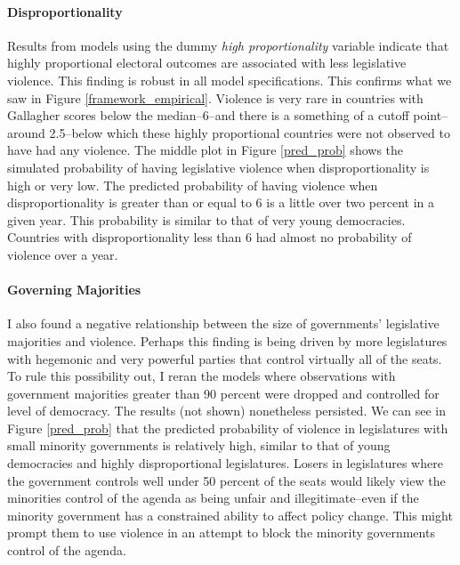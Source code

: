 \documentclass[a4paper]{article}\usepackage{graphicx, color}
\begin{document}
\paragraph{Disproportionality}
Results from models using the dummy {\emph{high proportionality}} variable indicate that highly proportional electoral outcomes are associated with less legislative violence. This finding is robust in all model specifications. This confirms what we saw in Figure \ref{framework_empirical}. Violence is very rare in countries with Gallagher scores below the median--6--and there is a something of a cutoff point--around 2.5--below which these highly proportional countries were not observed to have had any violence. The middle plot in Figure \ref{pred_prob} shows the simulated probability of having legislative violence when disproportionality is high or very low. The predicted probability of having violence when disproportionality is greater than or equal to 6 is a little over two percent in a given year. This probability is similar to that of very young democracies. Countries with disproportionality less than 6 had almost no probability of violence over a year.

\paragraph{Governing Majorities}
I also found a negative relationship between the size of governments' legislative majorities and violence. Perhaps this finding is being driven by more legislatures with hegemonic and very powerful parties that control virtually all of the seats. To rule this possibility out, I reran the models where observations with government majorities greater than 90 percent were dropped and controlled for level of democracy. The results (not shown) nonetheless persisted. We can see in Figure \ref{pred_prob} that the predicted probability of violence in legislatures with small minority governments is relatively high, similar to that of young democracies and highly disproportional legislatures. Losers in legislatures where the government controls well under 50 percent of the seats would likely view the minorities control of the agenda as being unfair and illegitimate--even if the minority government has a constrained ability to affect policy change. This might prompt them to use violence in an attempt to block the minority governments control of the agenda. 
\end{document}
